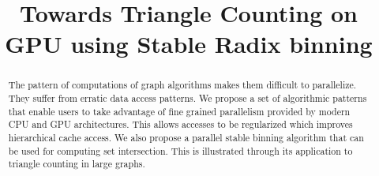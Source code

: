 \documentclass[conference]{IEEEtran}
\begin{document}
\title{Towards Triangle Counting on GPU using Stable Radix binning\\
}

\author{
\and
{}
}

\maketitle

\begin{abstract}
The pattern of computations of graph algorithms makes them difficult to parallelize. They suffer from erratic data access patterns. We propose a set of algorithmic patterns that enable users to take advantage of fine grained parallelism provided by modern CPU and GPU architectures. This allows accesses to be regularized which improves hierarchical cache access. We also propose a parallel stable binning algorithm that can be used for computing set intersection. This is illustrated through its application to triangle counting in large graphs.
\end{abstract}
\end{document}

